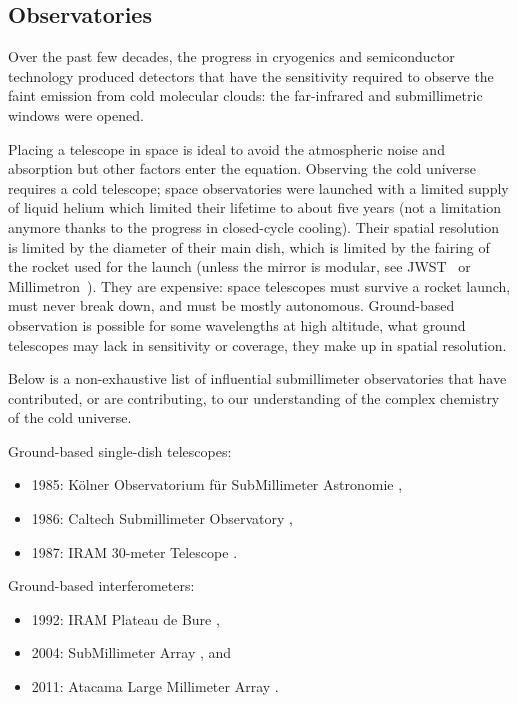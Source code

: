 \subsection{Observatories}

Over the past few decades, the progress in cryogenics and semiconductor technology produced detectors that have the sensitivity required to observe the faint emission from cold molecular clouds: the far-infrared and submillimetric windows were opened.

Placing a telescope in space is ideal to avoid the atmospheric noise and absorption but other factors enter the equation.
Observing the cold universe requires a cold telescope; space observatories were launched with a limited supply of liquid helium which limited their lifetime to about five years (not a limitation anymore thanks to the progress in closed-cycle cooling).
Their spatial resolution is limited by the diameter of their main dish, which is limited by the fairing of the rocket used for the launch (unless the mirror is modular, see JWST~\parencite{lightsey2012james} or Millimetron~\parencite{wild2009millimetron}).
They are expensive: space telescopes must survive a rocket launch, must never break down, and must be mostly autonomous.
Ground-based observation is possible for some wavelengths at high altitude,
what ground telescopes may lack in sensitivity or coverage, they make up in spatial resolution.

Below is a non-exhaustive list of influential submillimeter observatories that have contributed, or are contributing, to our understanding of the complex chemistry of the cold universe.

\begin{samepage}
Ground-based single-dish telescopes:
\begin{itemize}[noitemsep]
    \item 1985: Kölner Observatorium für SubMillimeter Astronomie \parencite{kramer1998new},
    \item 1986: Caltech Submillimeter Observatory   \parencite{murdin2000caltech},
    \item 1987: IRAM 30-meter Telescope             \parencite{baars1987iram}.
\end{itemize}
\end{samepage}

\begin{samepage}
Ground-based interferometers:
\begin{itemize}[noitemsep]
    \item 1992: IRAM Plateau de Bure             \parencite{guilloteau1992iram},
    \item 2004: SubMillimeter Array              \parencite{ho2004submillimeter}, and
    \item 2011: Atacama Large Millimeter Array   \parencite{wootten2009atacama}.
\end{itemize}
\end{samepage}

